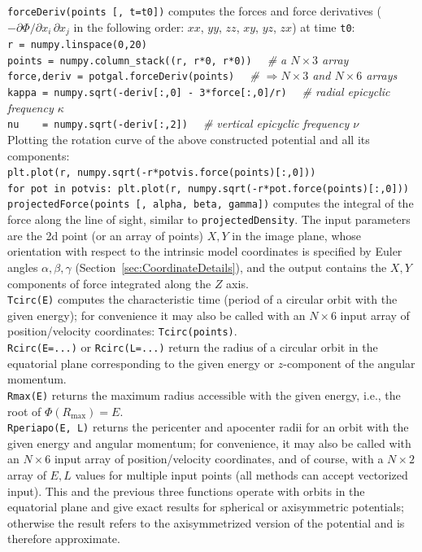\documentclass[12pt]{article}
\begin{document}
\texttt{forceDeriv(points [, t=t0])} computes the forces and force derivatives ($-\partial \Phi / \partial x_i\,\partial x_j$ in the following order: $xx$, $yy$, $zz$, $xy$, $yz$, $zx$) at time \texttt{t0}:\\[1mm]
\texttt{r = numpy.linspace(0,20)}\\
\texttt{points = numpy.column_stack((r, r*0, r*0))}
\textit{\color{Sepia} \ \ \# a $N\times3$ array}\\
\texttt{force,deriv = potgal.forceDeriv(points)}
\textit{\color{Sepia} \ \ \# $\Rightarrow N\times3$ and $N\times6$ arrays} \\
\texttt{kappa = numpy.sqrt(-deriv[:,0] - 3*force[:,0]/r)}
\textit{\color{Sepia} \ \ \# radial epicyclic frequency $\kappa$} \\
\texttt{nu~~~~= numpy.sqrt(-deriv[:,2])}
\textit{\color{Sepia} \ \ \# vertical epicyclic frequency $\nu$} \\[1mm]
Plotting the rotation curve of the above constructed potential and all its components:\\
\texttt{plt.plot(r, numpy.sqrt(-r*potvis.force(points)[:,0]))}\\
\texttt{for pot in potvis: plt.plot(r, numpy.sqrt(-r*pot.force(points)[:,0]))}\\[2mm]
\texttt{projectedForce(points [, alpha, beta, gamma])} computes the integral of the force along the line of sight, similar to \texttt{projectedDensity}. The input parameters are the 2d point (or an array of points) $X,Y$ in the image plane, whose orientation with respect to the intrinsic model coordinates is specified by Euler angles $\alpha, \beta, \gamma$ (Section~\ref{sec:CoordinateDetails}), and the output contains the $X,Y$ components of force integrated along the $Z$ axis.\\[2mm]
\texttt{Tcirc(E)} computes the characteristic time (period of a circular orbit with the given energy); for convenience it may also be called with an $N\times6$ input array of position/velocity coordinates: \texttt{Tcirc(points)}.\\[2mm]
\texttt{Rcirc(E=...)} or \texttt{Rcirc(L=...)} return the radius of a circular orbit in the equatorial plane corresponding to the given energy or $z$-component of the angular momentum.\\[2mm]
\texttt{Rmax(E)} returns the maximum radius accessible with the given energy, i.e., the root of $\Phi(R_\mathrm{max})=E$.\\[2mm]
\texttt{Rperiapo(E, L)} returns the pericenter and apocenter radii for an orbit with the given energy and angular momentum; for convenience, it may also be called with an $N\times6$ input array of position/velocity coordinates, and of course, with a $N\times2$ array of $E,L$ values for multiple input points (all methods can accept vectorized input). This and the previous three functions operate with orbits in the equatorial plane and give exact results for spherical or axisymmetric potentials; otherwise the result refers to the axisymmetrized version of the potential and is therefore approximate. \\[2mm]
\end{document}

